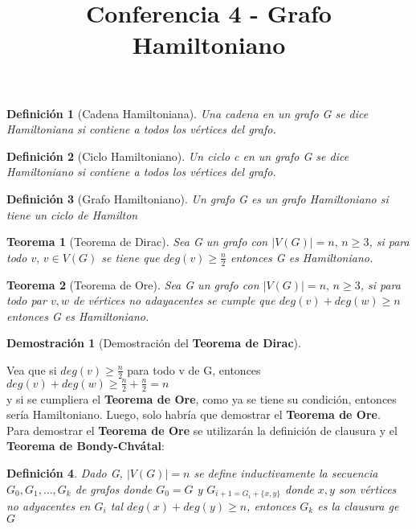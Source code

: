 \documentclass[a4paper,1pt]{report}
\title{Conferencia 4 - Grafo Hamiltoniano}
\author{}
\newtheorem*{teo}{Teorema}
\newtheorem*{dem}{Demostración}
\newtheorem*{dfn}{Definición}
\begin{document}
\maketitle

\begin{dfn}[Cadena Hamiltoniana] 
Una cadena en un grafo G se dice Hamiltoniana si contiene a
todos los vértices del grafo.
\end{dfn}

\begin{dfn}[Ciclo Hamiltoniano]
Un ciclo c en un grafo G se dice Hamiltoniano si contiene a todos los vértices del grafo.
\end{dfn}

\begin{dfn}[Grafo Hamiltoniano]
Un grafo G es un grafo Hamiltoniano si tiene un ciclo de Hamilton
\end{dfn}

\begin{teo}[Teorema de Dirac]
 Sea G un grafo con $|V(G)|=n,\, n\geq3$, si para todo $v,\, v\in V(G)$ se tiene que $deg(v)\geq \frac{n}{2}$ entonces G es Hamiltoniano.
\end{teo}

\begin{teo}[Teorema de Ore]
Sea G un grafo con $|V(G)|=n,\, n\geq3$, si para todo par $v,w$ de vértices no adayacentes se cumple que $deg(v)+deg(w)\geq n$ entonces G es Hamiltoniano.
\end{teo}
 
 \begin{dem}[Demostración del \textbf{Teorema de Dirac}] \end{dem}
 Vea que si $deg(v)\geq \frac{n}{2}$ para todo v de G, entonces\\ 
 
 $deg(v)+deg(w)\geq \frac{n}{2}+\frac{n}{2}=n$ \\
 
 y si se cumpliera el \textbf{Teorema de Ore}, como ya se tiene su condición, entonces sería Hamiltoniano. Luego, solo habría que demostrar el \textbf{Teorema de Ore}.\\
  
 Para demostrar el \textbf{Teorema de Ore} se utilizarán la definición de clausura y el \textbf{Teorema de Bondy-Chvátal}:
 
  \begin{dfn}
 Dado G, $|V(G)|=n$ se define inductivamente la secuencia $G_0,G_1,\dots,G_k$ de grafos donde
 $G_0=G$ y $G_{i+1=G_i+\{x,y\}}$ donde $x,y$ son vértices no adyacentes en $G_i$ tal $deg(x)+deg(y)\geq n$, entonces $G_k$ es la clausura ge $G$
 \end{dfn}
 
\end{document}
